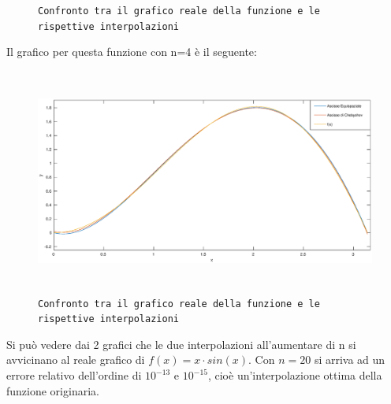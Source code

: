 \begin{flushleft}
\begin{figure}[H]
\caption{\texttt{Confronto tra il grafico reale della funzione e le rispettive interpolazioni}}
\end{figure}
Il grafico per questa funzione con n=4 è il seguente:
\begin{figure}[H]
\includegraphics[width=480px, height=280px]{plot/fes42c}
\caption{\texttt{Confronto tra il grafico reale della funzione e le rispettive interpolazioni}}
\end{figure}
Si può vedere dai 2 grafici che le due interpolazioni all'aumentare di n si avvicinano al reale grafico di $f(x)=x\cdot sin(x)$. Con $n=20$ si arriva ad un errore relativo dell'ordine di $10^{-13}$ e $10^{-15}$, cioè un'interpolazione ottima della funzione originaria.
\end{flushleft}